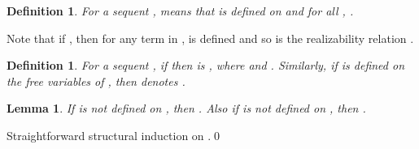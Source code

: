 \documentclass{LMCS}
\newtheorem{definition}[thm]{Definition}
\newtheorem{lemma}[thm]{Lemma}
\begin{document}
\begin{definition}
For a sequent ,  means that  is
defined on  and for all , .
\end{definition}

Note that if , then for any term  in ,
 is defined and so is the realizability relation .

\begin{definition}
For a sequent , if  then 
is , where  and .
Similarly, if  is defined on the free variables 
of , then  denotes . 
\end{definition}

\begin{lemma}\label{rhosubst}
If  is not defined on , then . Also
if  is not defined on , then . 
\end{lemma}
\proof Straightforward structural induction on .\qed
\end{document}
